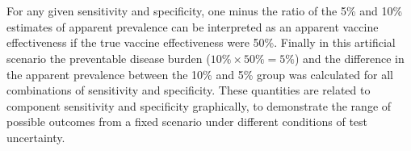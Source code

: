 \documentclass[a4paper,10pt]{article}
\title{}
\author{}
\begin{document}
\maketitle

\begin{abstract}

\end{abstract}

\section{}

For any given sensitivity and specificity, one minus the ratio of the 5\% and 10\% estimates of apparent prevalence can be interpreted as an apparent vaccine effectiveness if the true vaccine effectiveness were 50\%. Finally in this artificial scenario the preventable disease burden (\(10\% \times 50\% = 5\%\)) and the difference in the apparent prevalence between the 10\% and 5\% group was calculated for all combinations of sensitivity and specificity. These quantities are related to component sensitivity and specificity graphically, to demonstrate the range of possible outcomes from a fixed scenario under different conditions of test uncertainty.
\end{document}
